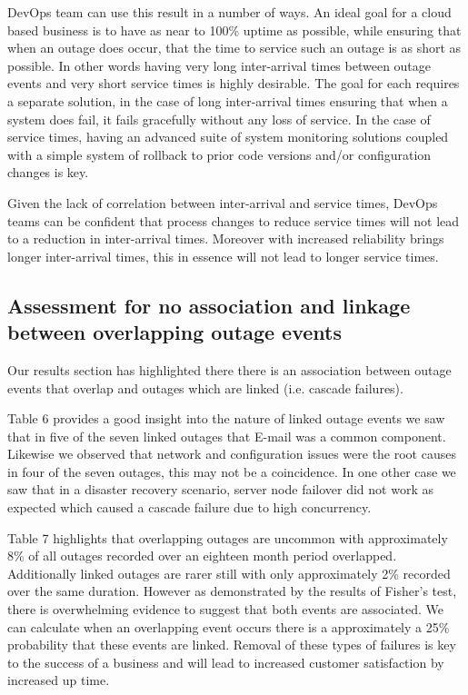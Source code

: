 \documentclass[5p]{elsarticle}
\begin{document}
DevOps team can use this result in a number of ways. An ideal goal for a cloud based business is to have as near to 100\% uptime as possible, while ensuring that when an outage does occur, that the time to service such an outage is as short as possible. In other words having very long inter-arrival times between outage events and very short service times is highly desirable. The goal for each requires a separate solution, in the case of long inter-arrival times ensuring that when a system does fail, it fails gracefully without any loss of service. In the case of service times, having an advanced suite of system monitoring solutions coupled with a simple system of rollback to prior code versions and/or configuration changes is key. 

Given the lack of correlation between inter-arrival and service times, DevOps teams can be confident that process changes to reduce service times will not lead to a reduction in inter-arrival times. Moreover with increased reliability brings longer inter-arrival times, this in essence will not lead to longer service times.


\subsection{Assessment for no association and linkage between overlapping outage events}

Our results section has highlighted there there is an association between outage events that overlap and outages which are linked (i.e. cascade failures).

Table 6 provides a good insight into the nature of linked outage events we saw that in five of the seven linked outages that E-mail was a common component. Likewise we observed that network and configuration issues were the root causes in four of the seven outages, this may not be a coincidence. In one other case we saw that in a disaster recovery scenario, server node failover did not work as expected which caused a cascade failure due to high concurrency.

Table 7 highlights that overlapping outages are uncommon with approximately 8\% of all outages recorded over an eighteen month period overlapped. Additionally linked outages are rarer still with only approximately 2\% recorded over the same duration. However as demonstrated by the results of Fisher's test, there is overwhelming evidence to suggest that both events are associated. We can calculate when an overlapping event occurs there is a approximately a 25\% probability that these events are linked. Removal of these types of failures is key to the success of a business and will lead to increased customer satisfaction by increased up time. 
\end{document}
